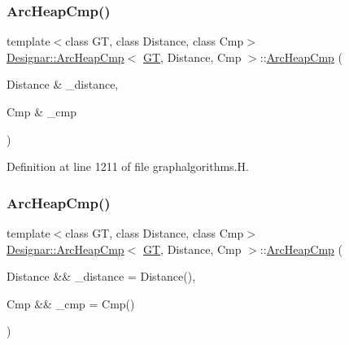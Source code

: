 \subsubsection{\texorpdfstring{Arc\+Heap\+Cmp()}{ArcHeapCmp()}\hspace{0.1cm}{\footnotesize\ttfamily [1/2]}}
{\footnotesize\ttfamily template$<$class GT, class Distance, class Cmp$>$ \\
\hyperlink{class_designar_1_1_arc_heap_cmp}{Designar\+::\+Arc\+Heap\+Cmp}$<$ \hyperlink{demo-buildgraph_8_c_a3001c40d2c31ca87ed96cd7d1334a55e}{GT}, Distance, Cmp $>$\+::\hyperlink{class_designar_1_1_arc_heap_cmp}{Arc\+Heap\+Cmp} (\begin{DoxyParamCaption}\item[{Distance \&}]{\+\_\+distance,  }\item[{Cmp \&}]{\+\_\+cmp }\end{DoxyParamCaption})\hspace{0.3cm}{\ttfamily [inline]}}



Definition at line 1211 of file graphalgorithms.\+H.

\mbox{\label{class_designar_1_1_arc_heap_cmp_a4a698d49f62f6261afcf3c49e4c09381}} 
\subsubsection{\texorpdfstring{Arc\+Heap\+Cmp()}{ArcHeapCmp()}\hspace{0.1cm}{\footnotesize\ttfamily [2/2]}}
{\footnotesize\ttfamily template$<$class GT, class Distance, class Cmp$>$ \\
\hyperlink{class_designar_1_1_arc_heap_cmp}{Designar\+::\+Arc\+Heap\+Cmp}$<$ \hyperlink{demo-buildgraph_8_c_a3001c40d2c31ca87ed96cd7d1334a55e}{GT}, Distance, Cmp $>$\+::\hyperlink{class_designar_1_1_arc_heap_cmp}{Arc\+Heap\+Cmp} (\begin{DoxyParamCaption}\item[{Distance \&\&}]{\+\_\+distance = {\ttfamily Distance()},  }\item[{Cmp \&\&}]{\+\_\+cmp = {\ttfamily Cmp()} }\end{DoxyParamCaption})\hspace{0.3cm}{\ttfamily [inline]}}



